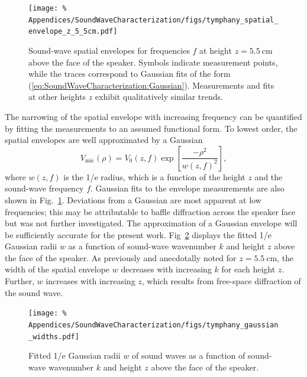 \begin{figure}
  \centering
  \texttt{[image: \%
    Appendices/SoundWaveCharacterization/figs/tymphany\_spatial\_envelope\_z\_5\_5cm.pdf]}
  \caption[Representative spatial envelopes of sound waves]{%
    Sound-wave spatial envelopes for frequencies $f$
    at height $z = \SI{5.5}{\centi\meter}$ above the face of the speaker.
    Symbols indicate measurement points, while
    the traces correspond to Gaussian fits of the form
    (\ref{eq:SoundWaveCharacterization:Gaussian}).
    Measurements and fits at other heights $z$
    exhibit qualitatively similar trends.
  }
\label{fig:SoundWaveCharacterization:tymphany_spatial_envelope_z_5_5cm}
\end{figure}

The narrowing of the spatial envelope with increasing frequency
can be quantified by fitting the measurements
to an assumed functional form.
To lowest order, the spatial envelopes are well approximated by a Gaussian
\begin{equation}
  V_{\text{mic}}(\rho)
  =
  V_0(z, f)
  \exp\left[
    \frac{-\rho^2}{w(z, f)^2}
  \right],
  \label{eq:SoundWaveCharacterization:Gaussian}
\end{equation}
where $w(z, f)$ is the 1/e radius, which
is a function of the height $z$ and the sound-wave frequency $f$.
Gaussian fits to the envelope measurements are also shown in
Fig.~\ref{fig:SoundWaveCharacterization:tymphany_spatial_envelope_z_5_5cm}.
Deviations from a Gaussian are most apparent at low frequencies;
this may be attributable to baffle diffraction across the speaker face but
was not further investigated.
The approximation of a Gaussian envelope
will be sufficiently accurate for the present work.
Fig~\ref{fig:SoundWaveCharacterization:tymphany_gaussian_widths}
displays the fitted 1/e Gaussian radii $w$ as a function of
sound-wave wavenumber $k$ and
height $z$ above the face of the speaker.
As previously and anecdotally noted for $z = \SI{5.5}{\centi\meter}$,
the width of the spatial envelope $w$
decreases with increasing $k$ for each height $z$.
Further, $w$ increases with increasing $z$, which
results from free-space diffraction of the sound wave.

\begin{figure}
  \centering
  \texttt{[image: \%
    Appendices/SoundWaveCharacterization/figs/tymphany\_gaussian\_widths.pdf]}
  \caption[Gaussian widths of sound waves]{%
    Fitted 1/e Gaussian radii $w$ of sound waves
    as a function of sound-wave wavenumber $k$ and
    height $z$ above the face of the speaker.
  }
\label{fig:SoundWaveCharacterization:tymphany_gaussian_widths}
\end{figure}


